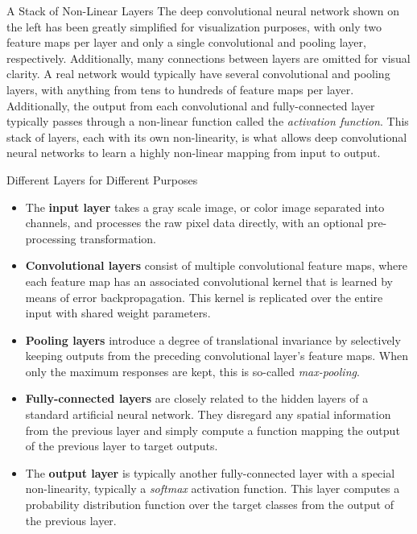 \documentclass[final,hyperref={pdfpagelabels=false}]{beamer}
\begin{document}
\begin{frame}
\begin{columns}[T]
  	\begin{column}{.32\textwidth}
      \begin{block}{A Stack of Non-Linear Layers}
        The deep convolutional neural network shown on the left has been greatly simplified for visualization purposes, with only
        two feature maps per layer and only a single convolutional and pooling layer, respectively.  Additionally, many connections
        between layers are omitted for visual clarity.
        A real network would typically have several convolutional and pooling layers, with anything from tens to hundreds of feature
        maps per layer.  Additionally, the output from each convolutional and fully-connected layer typically passes through a 
        non-linear function called the \emph{activation function}.  This stack of layers, each with its own non-linearity, is what
        allows deep convolutional neural networks to learn a highly non-linear mapping from input to output.
      \end{block}

      \begin{block}{Different Layers for Different Purposes}
        \begin{itemize} 
          \item The \textbf{input layer} takes a gray scale image, or color image separated into channels, and processes 
            the raw pixel data directly, with an optional pre-processing transformation.
          \item \textbf{Convolutional layers} consist of multiple convolutional feature maps, where each feature map has an associated
            convolutional kernel that is learned by means of error backpropagation.  This kernel is replicated over the entire input
            with shared weight parameters.
          \item \textbf{Pooling layers} introduce a degree of translational invariance by selectively keeping outputs from the
            preceding convolutional layer's feature maps.  When only the maximum responses are kept, this is so-called
            \emph{max-pooling}.
          \item \textbf{Fully-connected layers} are closely related to the hidden layers of a standard artificial neural network.  They
            disregard any spatial information from the previous layer and simply compute a function mapping the output of the 
            previous layer to target outputs.
          \item The \textbf{output layer} is typically another fully-connected layer with a special non-linearity, typically a 
            \emph{softmax} activation function.  This layer computes a probability distribution function over the target classes
            from the output of the previous layer.
        \end{itemize} 
      \end{block}


\end{column}
\end{columns}
\end{frame}
\end{document}

